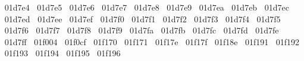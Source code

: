 {  ^^^^^^01d7e4%
  ^^^^^^01d7e5%
  ^^^^^^01d7e6%
  ^^^^^^01d7e7%
  ^^^^^^01d7e8%
  ^^^^^^01d7e9%
  ^^^^^^01d7ea%
  ^^^^^^01d7eb%
  ^^^^^^01d7ec%
  ^^^^^^01d7ed%
  ^^^^^^01d7ee%
  ^^^^^^01d7ef%
  ^^^^^^01d7f0%
  ^^^^^^01d7f1%
  ^^^^^^01d7f2%
  ^^^^^^01d7f3%
  ^^^^^^01d7f4%
  ^^^^^^01d7f5%
  ^^^^^^01d7f6%
  ^^^^^^01d7f7%
  ^^^^^^01d7f8%
  ^^^^^^01d7f9%
  ^^^^^^01d7fa%
  ^^^^^^01d7fb%
  ^^^^^^01d7fc%
  ^^^^^^01d7fd%
  ^^^^^^01d7fe%
  ^^^^^^01d7ff%
  ^^^^^^01f004%
  ^^^^^^01f0cf%
  ^^^^^^01f170%
  ^^^^^^01f171%
  ^^^^^^01f17e%
  ^^^^^^01f17f%
  ^^^^^^01f18e%
  ^^^^^^01f191%
  ^^^^^^01f192%
  ^^^^^^01f193%
  ^^^^^^01f194%
  ^^^^^^01f195%
  ^^^^^^01f196%
}
